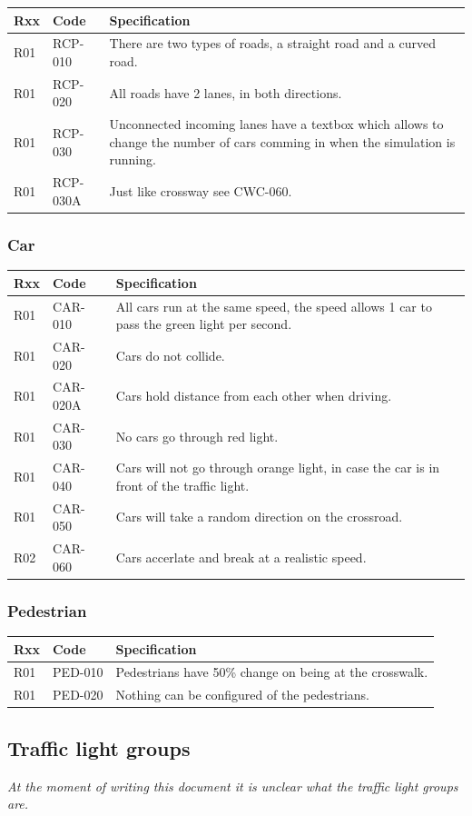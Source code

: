 \begin{tabularx}{\textwidth}{|p{0.5cm}p{2cm}X|}\hline
	Rxx & Code & Specification \\\hline
	R01 & RCP-010 & There are two types of roads, a straight road and a curved road.\\\hline
	R01 & RCP-020 & All roads have 2 lanes, in both directions.\\\hline
	R01 & RCP-030 & Unconnected incoming lanes have a textbox which allows to change the number of cars comming in when the simulation is running.\\\hline
	R01 & RCP-030A & Just like crossway see CWC-060.\\\hline
\end{tabularx}

\subsubsection{Car}
\begin{tabularx}{\textwidth}{|p{0.5cm}p{2cm}X|}\hline
	Rxx & Code & Specification \\\hline
	R01 & CAR-010 & All cars run at the same speed, the speed allows 1 car to pass the green light per second.\\\hline
	R01 & CAR-020 & Cars do not collide.\\\hline
	R01 & CAR-020A & Cars hold distance from each other when driving.\\\hline
	R01 & CAR-030 & No cars go through red light.\\\hline
	R01 & CAR-040 & Cars will not go through orange light, in case the car is in front of the traffic light.\\\hline
	R01 & CAR-050 & Cars will take a random direction on the crossroad.\\\hline
	R02 & CAR-060 & Cars accerlate and break at a realistic speed.\\\hline
\end{tabularx}

\subsubsection{Pedestrian}
\begin{tabularx}{\textwidth}{|p{0.5cm}p{2cm}X|}\hline
	Rxx & Code & Specification \\\hline
	R01 & PED-010 & Pedestrians have 50\% change on being at the crosswalk.\\\hline
	R01 & PED-020 & Nothing can be configured of the pedestrians.\\\hline
\end{tabularx}

\subsection{Traffic light groups}
\textsl{At the moment of writing this document it is unclear what the traffic light groups are.}
